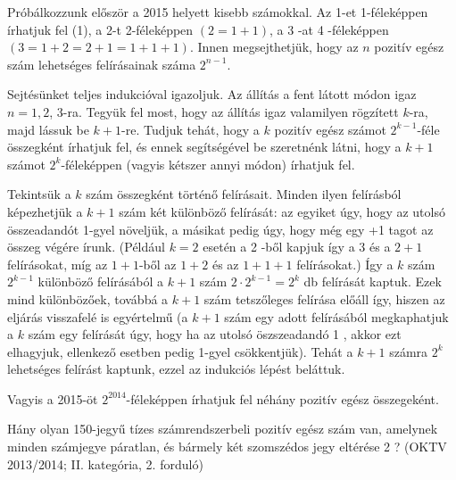 \begin{solution}
Próbálkozzunk először a 2015 helyett kisebb számokkal. Az 1-et 1-féleképpen
írhatjuk fel (1), a 2-t 2-féleképpen $(2=1+1)$, a 3 -at 4 -féleképpen
$(3=1+2=2+1=1+1+1)$. Innen megsejthetjük, hogy az $n$ pozitív egész
szám lehetséges felírásainak száma $2^{n-1}$.

Sejtésünket teljes indukcióval igazoljuk. Az állítás a fent látott
módon igaz $n=1,2$, 3-ra. Tegyük fel most, hogy az állítás igaz valamilyen
rögzített $k$-ra, majd lássuk be $k+1$-re. Tudjuk tehát, hogy a
$k$ pozitív egész számot $2^{k-1}$-féle összegként írhatjuk fel,
és ennek segítségével be szeretnénk látni, hogy a $k+1$ számot $2^{k}$-féleképpen
(vagyis kétszer annyi módon) írhatjuk fel.

Tekintsük a $k$ szám összegként történő felírásait. Minden ilyen
felírásból képezhetjük a $k+1$ szám két különböző felírását: az egyiket
úgy, hogy az utolsó összeadandót 1-gyel növeljük, a másikat pedig
úgy, hogy még egy +1 tagot az összeg végére írunk. (Például $k=2$
esetén a 2 -ből kapjuk így a 3 és a $2+1$ felírásokat, míg az $1+1$-ből
az $1+2$ és az $1+1+1$ felírásokat.) Így a $k$ szám $2^{k-1}$
különböző felírásából a $k+1$ szám $2\cdot2^{k-1}=2^{k}$ db felírását
kaptuk. Ezek mind különbözőek, továbbá a $k+1$ szám tetszőleges felírása
előáll így, hiszen az eljárás visszafelé is egyértelmű (a $k+1$ szám
egy adott felírásából megkaphatjuk a $k$ szám egy felírását úgy,
hogy ha az utolsó öszszeadandó 1 , akkor ezt elhagyjuk, ellenkező
esetben pedig 1-gyel csökkentjük). Tehát a $k+1$ számra $2^{k}$
lehetséges felírást kaptunk, ezzel az indukciós lépést beláttuk.

Vagyis a 2015-öt $2^{2014}$-féleképpen írhatjuk fel néhány pozitív
egész összegeként. 
\end{solution}
\begin{extraproblem}
Hány olyan 150-jegyű tízes számrendszerbeli pozitív egész szám van,
amelynek minden számjegye páratlan, és bármely két szomszédos jegy
eltérése 2 ? (OKTV 2013/2014; II. kategória, 2. forduló) 
\end{extraproblem}

